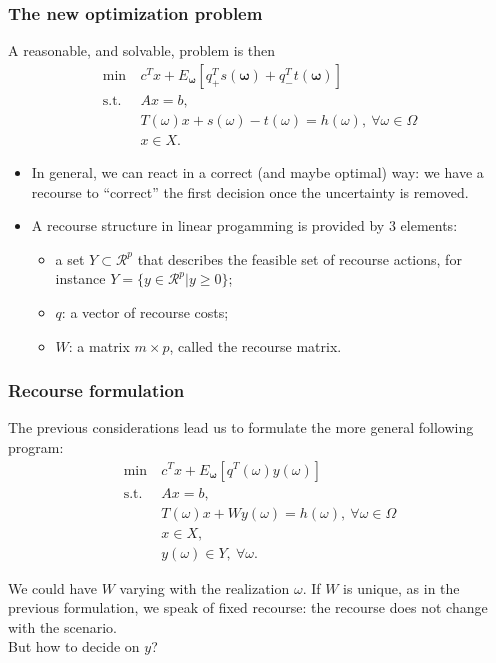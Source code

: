 \documentclass{beamer}
\def\bomega{\boldsymbol\omega}
\def\rit{\mathcal{R}}
\begin{document}
\begin{frame}
	\frametitle{The new optimization problem}
	
	A reasonable, and solvable, problem is then
	\begin{align*}
	\min\ & c^Tx+E_{\bomega}[q^T_+s(\bomega)+q^T_-t(\bomega)] \\
	\mbox{s.t. } & Ax = b, \\
	& T(\omega)x + s(\omega)-t(\omega) = h(\omega),\ \forall \omega
	\in \Omega \\
	& x \in X.
	\end{align*}
	\begin{itemize}
		\item
		In general, we can react in a correct (and maybe optimal) way: we have a recourse to ``correct'' the first decision once the uncertainty is removed.
		\item
		A recourse structure in linear progamming is provided by 3 elements:
		\begin{itemize}
			\item
			a set $Y \subset \rit^p$ that describes the feasible set of recourse actions, for instance $Y = \lbrace y \in \rit^p | y \geq 0 \rbrace$;
			\item
			$q$: a vector of recourse costs;
			\item
			$W$: a matrix $m \times p$, called the recourse matrix.
		\end{itemize}
	\end{itemize}
	
\end{frame}

\begin{frame}
	\frametitle{Recourse formulation}
	
	The previous considerations lead us to formulate the more general following program:
	\begin{align*}
	\min\ & c^Tx+E_{\bomega}[q^T(\omega)y(\omega)] \\
	\mbox{s.t. } & Ax = b, \\
	& T(\omega)x + Wy(\omega) = h(\omega),\ \forall \omega
	\in \Omega \\
	& x \in X, \\
	& y(\omega) \in Y,\ \forall \omega.
	\end{align*}
	
	We could have $W$ varying with the realization $\omega$.
	If $W$ is unique, as in the previous formulation, we speak of {\red fixed recourse}: the recourse does not change with the scenario.\\
	But how to decide on $y$?
	
\end{frame}
\end{document}
